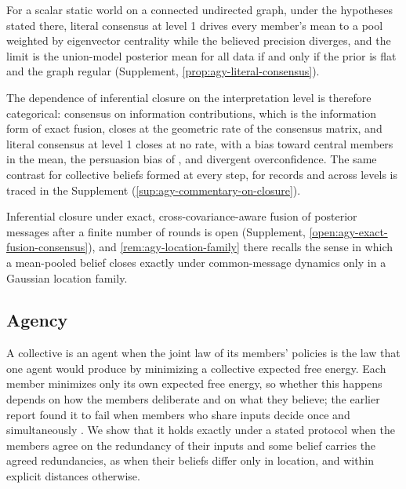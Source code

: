 For a scalar static world on a connected undirected graph, under the hypotheses stated there, literal consensus at level 1 drives every member's mean to a pool weighted by eigenvector centrality while the believed precision diverges, and the limit is the union-model posterior mean for all data if and only if the prior is flat and the graph regular (Supplement, \cref{prop:agy-literal-consensus}).

The dependence of inferential closure on the interpretation level is therefore categorical: consensus on information contributions, which is the information form of exact fusion, closes at the geometric rate of the consensus matrix, and literal consensus at level 1 closes at no rate, with a bias toward central members in the mean, the persuasion bias of \citet{demarzo2003persuasion}, and divergent overconfidence. The same contrast for collective beliefs formed at every step, for records and across levels is traced in the Supplement (\cref{sup:agy-commentary-on-closure}).

Inferential closure under exact, cross-covariance-aware fusion of posterior messages after a finite number of rounds is open (Supplement, \cref{open:agy-exact-fusion-consensus}), and \cref{rem:agy-location-family} there recalls the sense in which a mean-pooled belief closes exactly under common-message dynamics only in a Gaussian location family.

\subsection{Agency}\label{sec:agy-agency}

A collective is an agent when the joint law of its members' policies is the law that one agent would produce by minimizing a collective expected free energy. Each member minimizes only its own expected free energy, so whether this happens depends on how the members deliberate and on what they believe; the earlier report found it to fail when members who share inputs decide once and simultaneously \citep{dennis2026communicating}. We show that it holds exactly under a stated protocol when the members agree on the redundancy of their inputs and some belief carries the agreed redundancies, as when their beliefs differ only in location, and within explicit distances otherwise.

